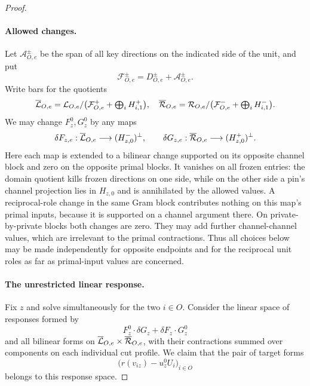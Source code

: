 \begin{proof}
\paragraph{Allowed changes.}
Let $\mathcal A_{O,e}^{\pm}$ be the span of all key directions
on the indicated side of the unit, and put
\[
 \mathcal F_{O,e}^{\pm}=D_{O,e}^{\pm}+\mathcal A_{O,e}^{\pm}.
\]
Write bars for the quotients
\[
 \overline{\mathcal L}_{O,e}
 =\mathcal L_{O,e}/\bigl(\mathcal F_{O,e}^{+}
                      +\textstyle\bigoplus_iH_{i,1}^{+}\bigr),
 \quad
 \overline{\mathcal R}_{O,e}
 =\mathcal R_{O,e}/\bigl(\mathcal F_{O,e}^{-}
                      +\textstyle\bigoplus_iH_{i,1}^{-}\bigr).
\]
We may change $F_z^0,G_z^0$ by any maps
\begin{equation}\label{eq:allowed-channel-changes}
 \delta F_{z,e}:\overline{\mathcal L}_{O,e}
                     \longrightarrow(H_{z,0}^-)^\perp,
 \qquad
 \delta G_{z,e}:\overline{\mathcal R}_{O,e}
                     \longrightarrow(H_{z,0}^+)^\perp.
\end{equation}
Here each map is extended to a bilinear change supported on
its opposite channel block and zero on the opposite primal
blocks.  It vanishes on all frozen entries: the domain
quotient kills frozen directions on one side, while on the
other side a pin's channel projection lies in $H_{z,0}$ and
is annihilated by the allowed values.  A reciprocal-role
change in the same Gram block contributes nothing on this
map's primal inputs, because it is supported on a channel
argument there.  On private-by-private blocks both changes
are zero.  They may add further channel-channel values, which
are irrelevant to the primal contractions.  Thus all choices
below may be made independently for opposite endpoints and
for the reciprocal unit roles as far as primal-input values
are concerned.

\paragraph{The unrestricted linear response.}
Fix $z$ and solve simultaneously for the two $i\in O$.
Consider the linear space of responses formed by
\[
 F_z^0\cdot\delta G_z+\delta F_z\cdot G_z^0
\]
and all bilinear forms on
$\overline{\mathcal L}_{O,e}\times\overline{\mathcal R}_{O,e}$, with their
contractions summed over components on each individual cut
profile.  We claim that the pair of target forms
\begin{equation}\label{eq:target-difference}
 \bigl(r(v_{iz})-u_z^0U_i\bigr)_{i\in O}
\end{equation}
belongs to this response space.


\end{proof}
